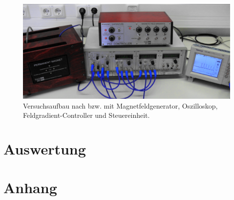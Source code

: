\documentclass[numbers=noenddot,a4paper,notitlepage,twoside,BCOR15mm]{scrartcl}
\begin{document}
			\begin{figure}[h]
				\centering
				\includegraphics[width=\textwidth]{aufbau.png}
				\caption{Versuchsaufbau nach \cite{UAchenNMR} bzw. \cite{EMAUGreifswaldNMR} mit Magnetfeldgenerator, Oszilloskop, Feldgradient-Controller und Steuereinheit.}
			\end{figure}

	\clearpage
	\section{Auswertung}\label{sec:auswert}

	\clearpage
	\section{Anhang}

		
		
\end{document}
